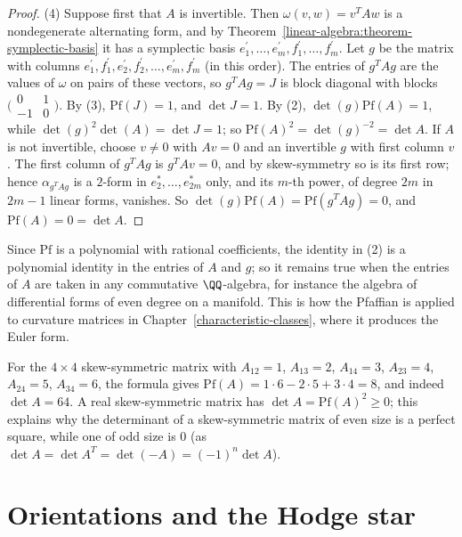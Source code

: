 \begin{proof}
(4) Suppose first that $A$ is invertible. Then $\omega(v, w) = v^TAw$ is a nondegenerate alternating form, and by Theorem~\ref{linear-algebra:theorem-symplectic-basis} it has a
symplectic basis $e_1^{\prime}, \ldots, e_m^{\prime}, f_1^{\prime}, \ldots, f_m^{\prime}$. Let $g$ be the matrix with columns $e_1^{\prime}, f_1^{\prime}, e_2^{\prime}, f_2^{\prime}, \ldots, e_m^{\prime}, f_m^{\prime}$
(in this order). The entries of $g^TAg$ are the values of $\omega$ on pairs of these vectors, so $g^TAg = J$ is block diagonal with blocks
$\bigl(\begin{smallmatrix} 0 & 1\\ -1 & 0\end{smallmatrix}\bigr)$. By (3), $\mathrm{Pf}(J) = 1$, and $\det J = 1$. By (2), $\det(g)\mathrm{Pf}(A) = 1$, while $\det(g)^2\det(A) = \det J = 1$;
so $\mathrm{Pf}(A)^2 = \det(g)^{-2} = \det A$. If $A$ is not invertible, choose $v \neq 0$ with $Av = 0$ and an invertible $g$ with first column $v$. The first column of $g^TAg$ is
$g^TAv = 0$, and by skew-symmetry so is its first row; hence $\alpha_{g^TAg}$ is a $2$-form in $e_2^*, \ldots, e_{2m}^*$ only, and its $m$-th power, of degree $2m$ in $2m - 1$ linear
forms, vanishes. So $\det(g)\mathrm{Pf}(A) = \mathrm{Pf}(g^TAg) = 0$, and $\mathrm{Pf}(A) = 0 = \det A$.
\end{proof}

Since $\mathrm{Pf}$ is a polynomial with rational coefficients, the identity in (2) is a polynomial identity in the entries of $A$ and $g$; so it remains true when the entries
of $A$ are taken in any commutative $\QQ$-algebra, for instance the algebra of differential forms of even degree on a manifold. This is how the Pfaffian is applied to curvature
matrices in Chapter~\ref{characteristic-classes}, where it produces the Euler form.

\begin{example}\label{multilinear-algebra:example-pfaffian}
For the $4 \times 4$ skew-symmetric matrix with $A_{12} = 1$, $A_{13} = 2$, $A_{14} = 3$, $A_{23} = 4$, $A_{24} = 5$, $A_{34} = 6$, the formula gives
$\mathrm{Pf}(A) = 1 \cdot 6 - 2 \cdot 5 + 3 \cdot 4 = 8$, and indeed $\det A = 64$. A real skew-symmetric matrix has $\det A = \mathrm{Pf}(A)^2 \geq 0$; this explains why the
determinant of a skew-symmetric matrix of even size is a perfect square, while one of odd size is $0$ (as $\det A = \det A^T = \det(-A) = (-1)^n\det A$).
\end{example}

\section{Orientations and the Hodge star}\label{multilinear-algebra:section-hodge-star}

